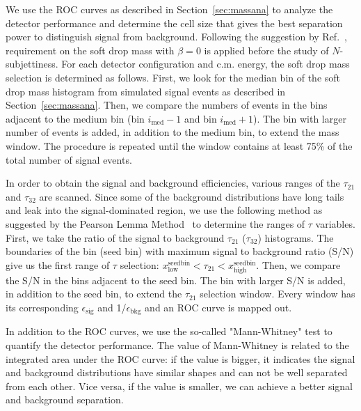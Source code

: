 We use the ROC curves as described in Section~\ref{sec:massana} to 
analyze the detector performance and determine the cell size that gives the 
best separation power to distinguish signal from background. 
Following the suggestion by Ref.~\cite{Dreyer:2018tjj}, requirement on the 
soft drop mass with $\beta=0$ is applied before the study of $N$-subjettiness. 
For each detector configuration and c.m. energy, the soft drop mass selection 
is determined as follows. First, we look for the median bin of the soft drop 
mass histogram from simulated signal events as described in 
Section~\ref{sec:massana}.  Then, we compare the numbers of events in the 
bins adjacent to the medium bin (bin $i_\mathrm{med}-1$ 
and bin $i_\mathrm{med}+1$). The bin with larger number of events is added, 
in addition to the medium bin, to extend the mass window. The procedure is 
repeated until the window contains at least 75\% of the total number of signal 
events. 

In order to obtain the signal and background efficiencies, 
various ranges of the $\tau_{21}$ and $\tau_{32}$ are scanned. 
Since some of the background distributions have long tails and leak into the 
signal-dominated region, we use the following method as suggested by the 
Pearson Lemma Method~\cite{} to determine the ranges of $\tau$ variables. 
First, we take the ratio of the signal to background $\tau_{21}$ ($\tau_{32}$) 
histograms. The boundaries of the bin (seed bin) with maximum signal to 
background ratio (S/N) give us the first range of $\tau$ selection: 
$x_\mathrm{low}^\mathrm{seedbin} < \tau_{21} <  x_\mathrm{high}^\mathrm{seedbin}$. 
Then, we compare the S/N in the bins adjacent to the seed bin. The bin with 
larger S/N is added, in addition to the seed bin, to extend the $\tau_{21}$ 
selection window. 
Every window has its corresponding $\epsilon_\mathrm{sig}$ and 
1/$\epsilon_\mathrm{bkg}$ and an ROC curve is mapped out. 

In addition to the ROC curves, we use the so-called "Mann-Whitney" test to 
quantify the detector performance. 
The value of Mann-Whitney is related to the integrated area under the ROC 
curve: if the value is bigger, it indicates the signal and background
 distributions have similar shapes and can not be well separated from 
each other. Vice versa, if the value is smaller, we can achieve a better 
signal and background separation. 

